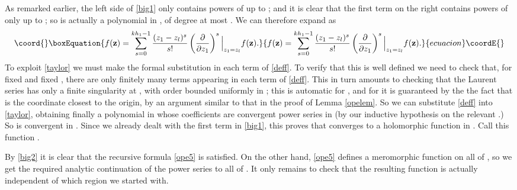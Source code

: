 \documentclass[a4paper,12pt]{article}
\providecommand{\C}{{\mathbb C}}
\providecommand{\zz}{{\mathbf z}}
\providecommand{\IP}[1]{\langle#1\rangle}
\providecommand{\dwrt}[1]{\frac{\partial}{\partial#1}}
\begin{document}
As remarked earlier, the left side of \eqref{big1}
only contains powers of \coordHE{} up to \coordHE{}; and it is clear that the first term on the right 
contains powers of \coordHE{} only up to \coordHE{}; so \myHighlight{$f(\zz)$}\coordHE{} is actually a polynomial in \coordHE{},
of degree at most \coordHE{}.  We can therefore expand \myHighlight{$f(\zz)$}\coordHE{} as
\begin{equation}\coord{}\boxEquation{ \label{taylor}
f(\zz) = \sum_{s=0}^{kh_1-1} \frac{(z_1-z_l)^s}{s!} \left(\dwrt{z_1}\right)^s \Big\vert_{z_1 = z_l} f(\zz).
}{ f(\zz) = \sum_{s=0}^{kh_1-1} \frac{(z_1-z_l)^s}{s!} \left(\dwrt{z_1}\right)^s \Big\vert_{z_1 = z_l} f(\zz).
}{ecuacion}\coordE{}\end{equation}
To exploit \eqref{taylor} we must make the formal substitution \coordHE{} in each term of \eqref{deff}.  
To verify that this is well defined we need to check that, for
fixed \coordHE{} and fixed \myHighlight{$\alpha+\beta$}\coordHE{}, 
there are only finitely many terms \coordHE{}
appearing in each term of \eqref{deff}.  This in turn amounts to checking that the 
Laurent series \coordHE{} has only a finite singularity at
 \coordHE{}, with order bounded uniformly in \coordHE{}; this is automatic for \coordHE{}, and
for \coordHE{} it is guaranteed by the
the fact that \coordHE{} is the coordinate closest to the origin, by an argument similar
to that in the proof of Lemma \ref{opelem}.  So we can substitute \eqref{deff} into
\eqref{taylor}, obtaining finally a polynomial in \coordHE{} whose coefficients are convergent power series in \coordHE{}
(by our inductive hypothesis on the relevant \coordHE{}.)  
So \myHighlight{$f(\zz)$}\coordHE{} is convergent in \coordHE{}.  Since we already dealt with the first term in \eqref{big1}, this
proves that \myHighlight{$\Pi \cdot \IP{\prod_{a=1}^l V(\psi_a, z_a)}_{\eta,R}$}\coordHE{} converges to a holomorphic function in \coordHE{}.
Call this function \myHighlight{$\Pi \cdot \IP{\prod_{a=1}^l V(\psi_a, z_a)}_{\eta}$}\coordHE{}.

By \eqref{big2} it is clear that the recursive formula 
\eqref{ope5} is satisfied.  On the other hand, \eqref{ope5} defines a meromorphic function on all of \myHighlight{$\C^l$}\coordHE{},
so we get the required analytic continuation of the power series \myHighlight{$\Pi \cdot \IP{\prod_{a=1}^l V(\psi_a, z_a)}_{\eta,R}$}\coordHE{}
to all of \myHighlight{$\C^l$}\coordHE{}.  It only remains
to check that the resulting function is actually independent of which region \coordHE{} we started with.
\end{document}
